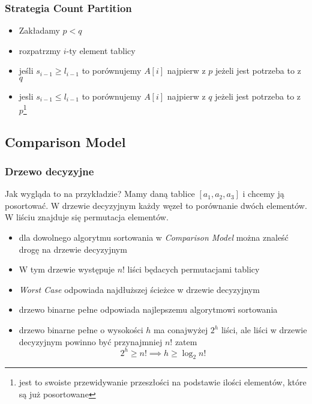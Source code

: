\documentclass[11pt,a4paper]{article}
\begin{document}
\subsubsection{Strategia Count Partition}
\begin{itemize}
    \item Zakładamy $p<q$
    \item rozpatrzmy $i$-ty element tablicy
    \item jeśli $s_{i-1} \geq l_{i-1}$ to porównujemy $A[i]$ najpierw z $p$ jeżeli jest potrzeba to z $q$
    \item jesli $s_{i-1} \leq l_{i-1}$ to porównujemy $A[i]$ najpierw z $q$ jeżeli jest potrzeba to z $p$\footnote{jest to swoiste przewidywanie przeszłości na podstawie ilości elementów, które są już posortowane}
\end{itemize}

\subsection{Comparison Model}
\subsubsection{Drzewo decyzyjne}
Jak wygląda to na przykładzie? Mamy daną tablice $[a_1, a_2, a_3]$ i chcemy ją posortować. W drzewie decyzyjnym każdy węzeł to porównanie dwóch elementów. W liściu znajduje się permutacja elementów.
\begin{center}\end{center}
\begin{itemize}
    \item dla dowolnego algorytmu sortowania w \textit{Comparison Model} można znaleść drogę na drzewie decyzyjnym
    \item W tym drzewie występuje $n!$ liści będacych permutacjami tablicy
    \item \textit{Worst Case} odpowiada najdłuższej ścieżce w drzewie decyzyjnym
    \item drzewo binarne pełne odpowiada najlepszemu algorytmowi sortowania
    \item drzewo binarne pełne o wysokości $h$ ma conajwyżej $2^h$ liści, ale liści w drzewie decyzyjnym powinno być przynajmniej $n!$ zatem
        \[
            2^h \geq n! \implies h \geq \log_2 n!
        \]
\end{itemize}
\end{document}
